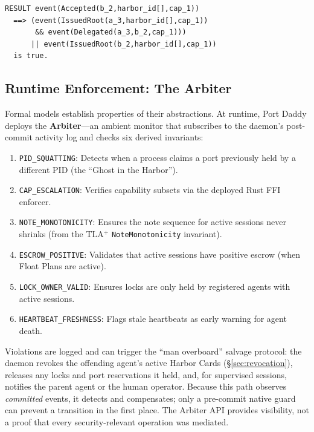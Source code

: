 \documentclass[11pt,a4paper]{article}
\theoremstyle{definition}
\begin{document}
\begin{lstlisting}[caption={ProVerif 2.05 Terminal Output --- Phase 3 Authorization Chain}]
RESULT event(Accepted(b_2,harbor_id[],cap_1))
  ==> (event(IssuedRoot(a_3,harbor_id[],cap_1))
       && event(Delegated(a_3,b_2,cap_1)))
      || event(IssuedRoot(b_2,harbor_id[],cap_1))
  is true.
\end{lstlisting}

\subsection{Runtime Enforcement: The Arbiter}

Formal models establish properties of their abstractions. At runtime, Port Daddy deploys the \textbf{Arbiter}---an ambient monitor that subscribes to the daemon's post-commit activity log and checks six derived invariants:

\begin{enumerate}
  \item \texttt{PID\_SQUATTING}: Detects when a process claims a port previously held by a different PID (the ``Ghost in the Harbor'').
  \item \texttt{CAP\_ESCALATION}: Verifies capability subsets via the deployed Rust FFI enforcer.
  \item \texttt{NOTE\_MONOTONICITY}: Ensures the note sequence for active sessions never shrinks (from the TLA$^{+}$ \texttt{NoteMonotonicity} invariant).
  \item \texttt{ESCROW\_POSITIVE}: Validates that active sessions have positive escrow (when Float Plans are active).
  \item \texttt{LOCK\_OWNER\_VALID}: Ensures locks are only held by registered agents with active sessions.
  \item \texttt{HEARTBEAT\_FRESHNESS}: Flags stale heartbeats as early warning for agent death.
\end{enumerate}

Violations are logged and can trigger the ``man overboard'' salvage protocol: the daemon revokes the offending agent's active Harbor Cards (\S\ref{sec:revocation}), releases any locks and port reservations it held, and, for supervised sessions, notifies the parent agent or the human operator. Because this path observes \emph{committed} events, it detects and compensates; only a pre-commit native guard can prevent a transition in the first place. The Arbiter API provides visibility, not a proof that every security-relevant operation was mediated.
\end{document}
